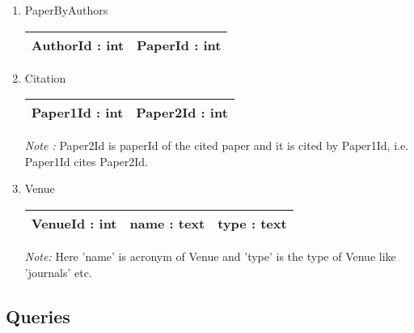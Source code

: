 \documentclass[10pt]{article}
\begin{document}
\begin{enumerate}
\begin{enumerate}
\item PaperByAuthors\\
        \begin{tabular}{|c|c|}
            \hline
             AuthorId : int & PaperId : int \\
            \hline
        \end{tabular}
\item Citation\\
        \begin{tabular}{|c|c|}
            \hline
             Paper1Id : int & Paper2Id : int \\
            \hline
        \end{tabular}

\emph{Note :} Paper2Id is paperId of the cited paper and it is cited by Paper1Id, i.e. Paper1Id cites Paper2Id.

\item Venue\\
        \begin{tabular}{|c|c|c|}
            \hline
             VenueId : int & name : text & type : text\\
            \hline
        \end{tabular}

\emph{Note:} Here 'name' is acronym of Venue and 'type' is the type of Venue like 'journals' etc.
\end{enumerate}

\end{enumerate}

\subsection{Queries}
\end{document}
